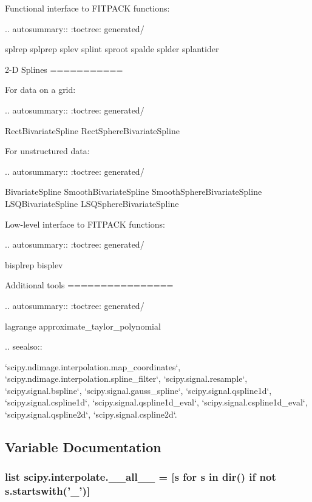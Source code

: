 \begin{DoxyVerb}
Functional interface to FITPACK functions:

.. autosummary::
   :toctree: generated/

   splrep
   splprep
   splev
   splint
   sproot
   spalde
   splder
   splantider


2-D Splines
===========

For data on a grid:

.. autosummary::
   :toctree: generated/

   RectBivariateSpline
   RectSphereBivariateSpline

For unstructured data:

.. autosummary::
   :toctree: generated/

   BivariateSpline
   SmoothBivariateSpline
   SmoothSphereBivariateSpline
   LSQBivariateSpline
   LSQSphereBivariateSpline

Low-level interface to FITPACK functions:

.. autosummary::
   :toctree: generated/

   bisplrep
   bisplev

Additional tools
================

.. autosummary::
   :toctree: generated/

   lagrange
   approximate_taylor_polynomial

.. seealso::

   `scipy.ndimage.interpolation.map_coordinates`,
   `scipy.ndimage.interpolation.spline_filter`,
   `scipy.signal.resample`,
   `scipy.signal.bspline`,
   `scipy.signal.gauss_spline`,
   `scipy.signal.qspline1d`,
   `scipy.signal.cspline1d`,
   `scipy.signal.qspline1d_eval`,
   `scipy.signal.cspline1d_eval`,
   `scipy.signal.qspline2d`,
   `scipy.signal.cspline2d`.\end{DoxyVerb}
 

\subsection{Variable Documentation}
\hypertarget{namespacescipy_1_1interpolate_a083c488e6f9e17b97923b2b404d877ed}{}
\subsubsection[{\+\_\+\+\_\+all\+\_\+\+\_\+}]{\setlength{\rightskip}{0pt plus 5cm}list scipy.\+interpolate.\+\_\+\+\_\+all\+\_\+\+\_\+ = \mbox{[}{\bf s} for {\bf s} in dir() {\bf if} not s.\+startswith('\+\_\+')\mbox{]}}\label{namespacescipy_1_1interpolate_a083c488e6f9e17b97923b2b404d877ed}
\hypertarget{namespacescipy_1_1interpolate_a6d49ea9757d79c91d1d8df0b91e7b3d2}{}
